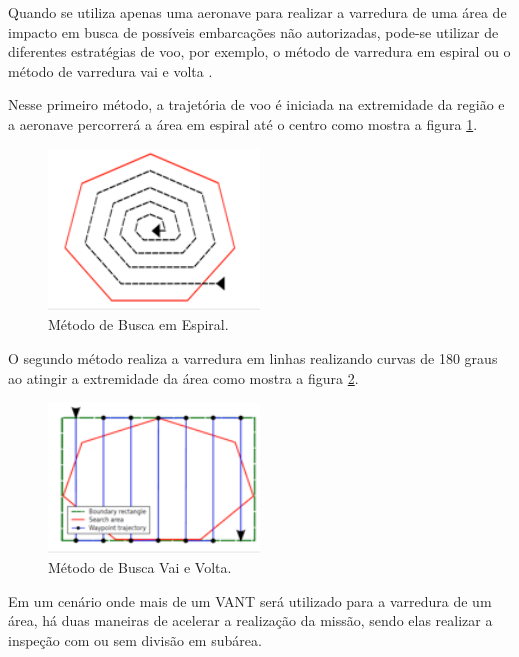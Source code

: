 \label{Cap:Estrategia}

Quando se utiliza apenas uma aeronave para realizar a varredura de uma área de impacto em busca de possíveis embarcações não autorizadas, pode-se utilizar de diferentes estratégias de voo, por exemplo, o método de varredura em espiral ou o método de varredura vai e volta \cite{ost2012search}. 

Nesse primeiro método, a trajetória de voo é iniciada na extremidade da região e a aeronave percorrerá a área em espiral até o centro como mostra a figura \ref{fig:espiral}. 

\begin{figure} 
\center
\includegraphics[width=0.5\textwidth]{espiral.png}
\caption{Método de Busca em Espiral.} 
\label{fig:espiral}
\end{figure} 

O segundo método realiza a varredura em linhas realizando curvas de 180 graus ao atingir a extremidade da área como mostra a figura \ref{fig:vaievolta}.

\begin{figure} 
\center
\includegraphics[width=0.5\textwidth]{vaievolta.png}
\caption{Método de Busca Vai e Volta.} 
\label{fig:vaievolta}
\end{figure} 

Em um cenário onde mais de um VANT será utilizado para a varredura de um área, há duas maneiras de acelerar a realização da missão, sendo elas realizar a inspeção com ou sem divisão em subárea. 

